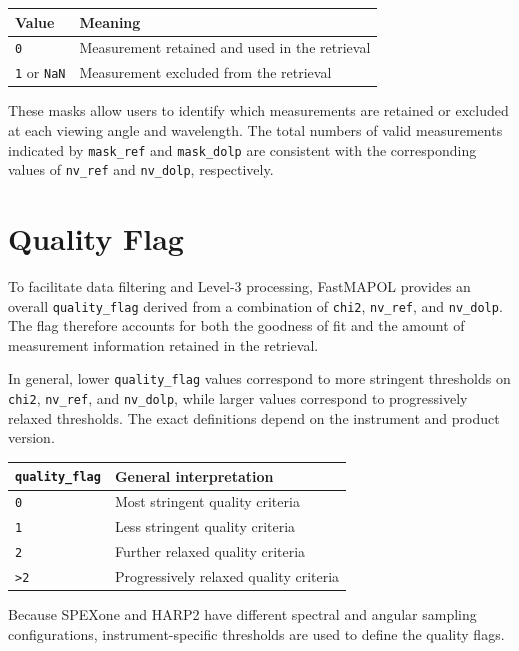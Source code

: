 \documentclass[
  11pt,
  letterpaper,
]{scrreprt}
\begin{document}
\begin{longtable}[]{@{}ll@{}}
\toprule\noalign{}
Value & Meaning \\
\midrule\noalign{}
\endhead
\bottomrule\noalign{}
\endlastfoot
\texttt{0} & Measurement retained and used in the retrieval \\
\texttt{1} or \texttt{NaN} & Measurement excluded from the retrieval \\
\end{longtable}

These masks allow users to identify which measurements are retained or
excluded at each viewing angle and wavelength. The total numbers of
valid measurements indicated by \texttt{mask\_ref} and
\texttt{mask\_dolp} are consistent with the corresponding values of
\texttt{nv\_ref} and \texttt{nv\_dolp}, respectively.

\section{Quality Flag}\label{quality-flag}

To facilitate data filtering and Level-3 processing, FastMAPOL provides
an overall \texttt{quality\_flag} derived from a combination of
\texttt{chi2}, \texttt{nv\_ref}, and \texttt{nv\_dolp}. The flag
therefore accounts for both the goodness of fit and the amount of
measurement information retained in the retrieval.

In general, lower \texttt{quality\_flag} values correspond to more
stringent thresholds on \texttt{chi2}, \texttt{nv\_ref}, and
\texttt{nv\_dolp}, while larger values correspond to progressively
relaxed thresholds. The exact definitions depend on the instrument and
product version.

\begin{longtable}[]{@{}ll@{}}
\toprule\noalign{}
\texttt{quality\_flag} & General interpretation \\
\midrule\noalign{}
\endhead
\bottomrule\noalign{}
\endlastfoot
\texttt{0} & Most stringent quality criteria \\
\texttt{1} & Less stringent quality criteria \\
\texttt{2} & Further relaxed quality criteria \\
\texttt{\textgreater{}2} & Progressively relaxed quality criteria \\
\end{longtable}

Because SPEXone and HARP2 have different spectral and angular sampling
configurations, instrument-specific thresholds are used to define the
quality flags.
\end{document}

